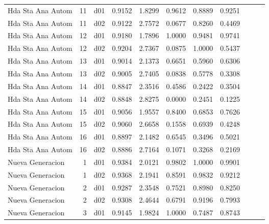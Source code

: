 \begin{landscape}
\begin{longtable}{p{2cm}rrrrrrrrrr}
       Hda Sta Ana Autom  &         11 &     d01 &   0.9152 &  1.8299 &        0.9612 &           0.8889 &  0.9251 \\
       Hda Sta Ana Autom  &         11 &     d02 &   0.9122 &  2.7572 &        0.0677 &           0.8260 &  0.4469 \\
       Hda Sta Ana Autom  &         12 &     d01 &   0.9180 &  1.7896 &        1.0000 &           0.9481 &  0.9741 \\
       Hda Sta Ana Autom  &         12 &     d02 &   0.9204 &  2.7367 &        0.0875 &           1.0000 &  0.5437 \\
       Hda Sta Ana Autom  &         13 &     d01 &   0.9014 &  2.1373 &        0.6651 &           0.5960 &  0.6306 \\
       Hda Sta Ana Autom  &         13 &     d02 &   0.9005 &  2.7405 &        0.0838 &           0.5778 &  0.3308 \\
       Hda Sta Ana Autom  &         14 &     d01 &   0.8847 &  2.3516 &        0.4586 &           0.2422 &  0.3504 \\
       Hda Sta Ana Autom  &         14 &     d02 &   0.8848 &  2.8275 &        0.0000 &           0.2451 &  0.1225 \\
       Hda Sta Ana Autom  &         15 &     d01 &   0.9056 &  1.9557 &        0.8400 &           0.6853 &  0.7626 \\
       Hda Sta Ana Autom  &         15 &     d02 &   0.9060 &  2.6658 &        0.1558 &           0.6939 &  0.4248 \\
       Hda Sta Ana Autom  &         16 &     d01 &   0.8897 &  2.1482 &        0.6545 &           0.3496 &  0.5021 \\
       Hda Sta Ana Autom  &         16 &     d02 &   0.8886 &  2.7164 &        0.1071 &           0.3268 &  0.2169 \\
        Nueva Generacion  &          1 &     d01 &   0.9384 &  2.0121 &        0.9802 &           1.0000 &  0.9901 \\
        Nueva Generacion  &          1 &     d02 &   0.9368 &  2.1941 &        0.8591 &           0.9832 &  0.9212 \\
        Nueva Generacion  &          2 &     d01 &   0.9287 &  2.3548 &        0.7521 &           0.8980 &  0.8250 \\
        Nueva Generacion  &          2 &     d02 &   0.9308 &  2.4644 &        0.6791 &           0.9196 &  0.7993 \\
        Nueva Generacion  &          3 &     d01 &   0.9145 &  1.9824 &        1.0000 &           0.7487 &  0.8743 \\

\end{longtable}
\end{landscape}
